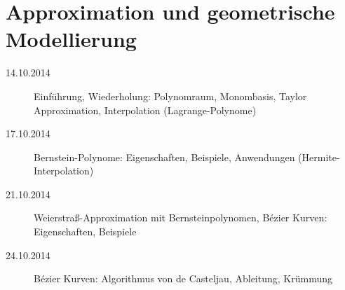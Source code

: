 \documentclass{mycourse}
\begin{document}
\section*{Approximation und geometrische Modellierung}

\begin{description}
	\item[14.10.2014]
		Einführung, Wiederholung: Polynomraum, Monombasis, Taylor Approximation, Interpolation (Lagrange-Polynome)
	\item[17.10.2014]
		Bernstein-Polynome: Eigenschaften, Beispiele, Anwendungen (Hermite-Interpolation)
	\item[21.10.2014]
		Weierstraß-Approximation mit Bernsteinpolynomen, Bézier Kurven: Eigenschaften, Beispiele
	\item[24.10.2014]
		Bézier Kurven: Algorithmus von de Casteljau, Ableitung, Krümmung
\end{description}
\end{document}
